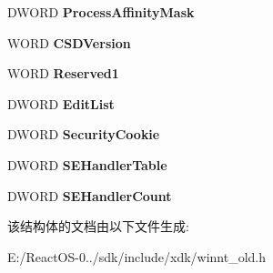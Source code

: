 \begin{DoxyCompactItemize}
D\+W\+O\+RD {\bfseries Process\+Affinity\+Mask}
\item 
\mbox{\label{struct___i_m_a_g_e___l_o_a_d___c_o_n_f_i_g___d_i_r_e_c_t_o_r_y32_ab6455a7f2d44b3a520a60e35c70caa2a}} 
W\+O\+RD {\bfseries C\+S\+D\+Version}
\item 
\mbox{\label{struct___i_m_a_g_e___l_o_a_d___c_o_n_f_i_g___d_i_r_e_c_t_o_r_y32_a875df859a5f5f34799f358d42d1ad9fd}} 
W\+O\+RD {\bfseries Reserved1}
\item 
\mbox{\label{struct___i_m_a_g_e___l_o_a_d___c_o_n_f_i_g___d_i_r_e_c_t_o_r_y32_a9a456b3d87748cc684d0eca839437cd4}} 
D\+W\+O\+RD {\bfseries Edit\+List}
\item 
\mbox{\label{struct___i_m_a_g_e___l_o_a_d___c_o_n_f_i_g___d_i_r_e_c_t_o_r_y32_ac5eeb447307711308d8bdefb396b380b}} 
D\+W\+O\+RD {\bfseries Security\+Cookie}
\item 
\mbox{\label{struct___i_m_a_g_e___l_o_a_d___c_o_n_f_i_g___d_i_r_e_c_t_o_r_y32_af286203a5e89a3c32bd83281d29029d4}} 
D\+W\+O\+RD {\bfseries S\+E\+Handler\+Table}
\item 
\mbox{\label{struct___i_m_a_g_e___l_o_a_d___c_o_n_f_i_g___d_i_r_e_c_t_o_r_y32_a8d7a304854a4cbd740595fd7752e2ae6}} 
D\+W\+O\+RD {\bfseries S\+E\+Handler\+Count}
\end{DoxyCompactItemize}


该结构体的文档由以下文件生成\+:\begin{DoxyCompactItemize}
\item 
E\+:/\+React\+O\+S-\/0../sdk/include/xdk/winnt\+\_\+old.\+h\end{DoxyCompactItemize}
